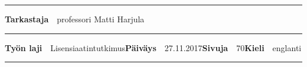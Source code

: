 \begin{spacing}{.88}
{\vspace{-2.4mm}\rule{\textwidth}{.75pt}

{\fontsize{10.5pt}{10.5pt}\bfseries\sffamily\lsstyle Tarkastaja}~~{\small professori Matti Harjula}

\vspace{-2.4mm}\rule{\textwidth}{.75pt}

{\fontsize{10.5pt}{10.5pt}\bfseries\sffamily\lsstyle Työn laji}~~{\small Lisensiaatintutkimus}\hfill{\fontsize{10.5pt}{10.5pt}\bfseries\sffamily\lsstyle Päiväys}~~{\small 27.11.2017}\hfill{\fontsize{10.5pt}{10.5pt}\bfseries\sffamily\lsstyle Sivuja}~~{\small 70}\hfill{\fontsize{10.5pt}{10.5pt}\bfseries\sffamily\lsstyle Kieli}~~{\small englanti}

\vspace{-2.4mm}\rule{\textwidth}{.75pt}

\vspace{6mm}

} %
\end{spacing}
